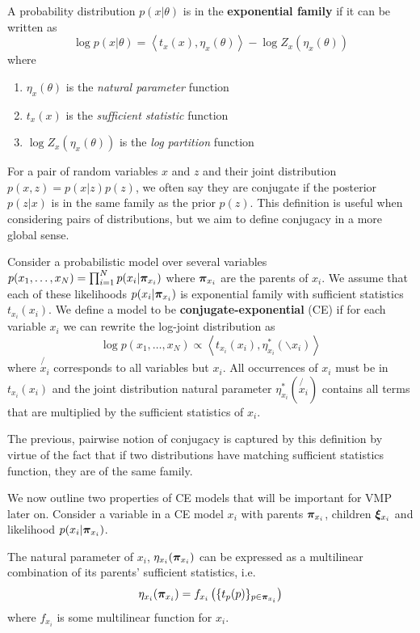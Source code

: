 \begin{definition}
A probability distribution $p(x | \theta)$ is in the \textbf{exponential family}
if it can be written as
\begin{equation}
    \log p(x | \theta) = \left\langle t_x(x),\eta_x(\theta)\right\rangle - \log Z_x(\eta_x(\theta))
\end{equation}
where
\begin{enumerate}
    \item $\eta_x(\theta)$ is the \emph{natural parameter} function
    \item $t_x(x)$ is the \emph{sufficient statistic} function
    \item $\log Z_x(\eta_x(\theta))$ is the \emph{log partition} function
\end{enumerate}
\end{definition}


For a pair of random variables $x$ and $z$ and their
joint distribution $p(x, z) = p(x | z)p(z)$, we often say
they are conjugate if the posterior $p(z|x)$ is in the same
family as the prior $p(z)$. This definition
is useful when considering pairs of distributions,
but we aim to define conjugacy in a more global sense.

\begin{definition}
\label{def:conjugacy}
Consider a probabilistic model over several variables $p(x_1, \ldots, x_N) = \prod_{i = 1}^N p(x_i | \bm{\pi}_{x_i})$ where $\bm{\pi}_{x_i}$ are the parents of $x_i$.
We assume that each of these likelihoods $p(x_i | \bm{\pi}_{x_i})$
is exponential family with sufficient statistics $t_{x_i}(x_i)$.
We define a model to be \textbf{conjugate-exponential} (CE)
if for each variable $x_i$ we can rewrite
the log-joint distribution as
\begin{equation}\label{eq:natparam}
    \log p(x_1, \ldots, x_N) \propto \left\langle t_{x_i}(x_i), \eta^*_{x_i}(\backslash x_i)\right\rangle
\end{equation}
where $\not{x_i}$ corresponds to all variables but $x_i$.
All occurrences of $x_i$ must be in $t_{x_i}(x_i)$ and the
joint distribution natural parameter $\eta^*_{x_i}(\not{x_i})$
contains all terms that are multiplied by the sufficient statistics of $x_i$.
\end{definition}
The previous, pairwise notion of conjugacy is captured by this definition 
by virtue of the fact that if two distributions
have matching sufficient statistics function, they are of the same family.

We now outline two properties of CE models
that will be important for VMP later on.
Consider a variable in a CE model $x_i$ with
parents $\bm{\pi}_{x_i}$, children $\bm{\xi}_{x_i}$
and likelihood $p(x_i | \bm{\pi}_{x_i})$.
\begin{property}
\label{prop:multilinear}
The natural parameter of $x_i$, $\eta_{x_i}(\bm{\pi}_{x_i})$
can be expressed as a multilinear combination
of its parents' sufficient statistics, i.e.
\begin{equation}
    \eta_{x_i}(\bm{\pi}_{x_i}) = f_{x_i}\left(\{t_p(p)\}_{p \in \bm{\pi}_{x_i}}\right)
\end{equation}
where $f_{x_i}$ is some multilinear function for $x_i$.
\end{property}


